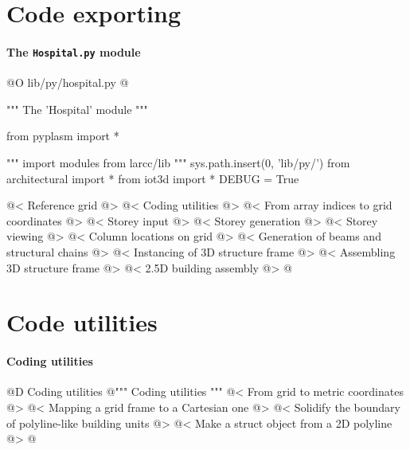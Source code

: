 \documentclass[11pt,oneside]{article}    %
\begin{document}
\section{Code exporting}

\paragraph{The \texttt{Hospital.py} module}
@O lib/py/hospital.py
@{""" The 'Hospital' module """

from pyplasm import *

""" import modules from larcc/lib """
sys.path.insert(0, 'lib/py/')
from architectural import *
from iot3d import *
DEBUG = True

@< Reference grid @>
@< Coding utilities @>
@< From array indices to grid coordinates @>
@< Storey input @>
@< Storey generation @>
@< Storey viewing @>
@< Column locations on grid @>
@< Generation of beams and structural chains @>
@< Instancing of 3D structure frame @>
@< Assembling 3D structure frame @>
@< 2.5D building assembly @>
@}


\appendix
\section{Code utilities}

\paragraph{Coding utilities}
@D Coding utilities
@{""" Coding utilities """
@< From grid to metric coordinates @>
@< Mapping a grid frame to a Cartesian one @>
@< Solidify the boundary of polyline-like building units @>
@< Make a struct object from a 2D polyline @>
@}
\end{document}
